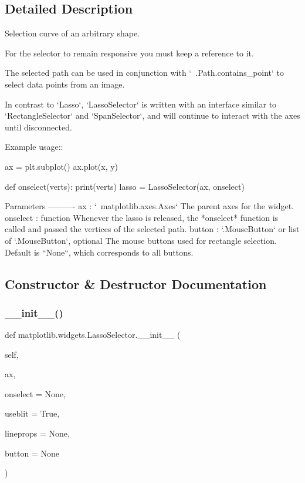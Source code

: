 \subsection{Detailed Description}
\begin{DoxyVerb}Selection curve of an arbitrary shape.

For the selector to remain responsive you must keep a reference to it.

The selected path can be used in conjunction with `~.Path.contains_point`
to select data points from an image.

In contrast to `Lasso`, `LassoSelector` is written with an interface
similar to `RectangleSelector` and `SpanSelector`, and will continue to
interact with the axes until disconnected.

Example usage::

    ax = plt.subplot()
    ax.plot(x, y)

    def onselect(verts):
        print(verts)
    lasso = LassoSelector(ax, onselect)

Parameters
----------
ax : `~matplotlib.axes.Axes`
    The parent axes for the widget.
onselect : function
    Whenever the lasso is released, the *onselect* function is called and
    passed the vertices of the selected path.
button : `.MouseButton` or list of `.MouseButton`, optional
    The mouse buttons used for rectangle selection.  Default is ``None``,
    which corresponds to all buttons.
\end{DoxyVerb}
 

\subsection{Constructor \& Destructor Documentation}
\mbox{\label{classmatplotlib_1_1widgets_1_1LassoSelector_a90fd4fad181512ce9e21637bc815b754}} 
\subsubsection{\texorpdfstring{\+\_\+\+\_\+init\+\_\+\+\_\+()}{\_\_init\_\_()}}
{\footnotesize\ttfamily def matplotlib.\+widgets.\+Lasso\+Selector.\+\_\+\+\_\+init\+\_\+\+\_\+ (\begin{DoxyParamCaption}\item[{}]{self,  }\item[{}]{ax,  }\item[{}]{onselect = {\ttfamily None},  }\item[{}]{useblit = {\ttfamily True},  }\item[{}]{lineprops = {\ttfamily None},  }\item[{}]{button = {\ttfamily None} }\end{DoxyParamCaption})}




